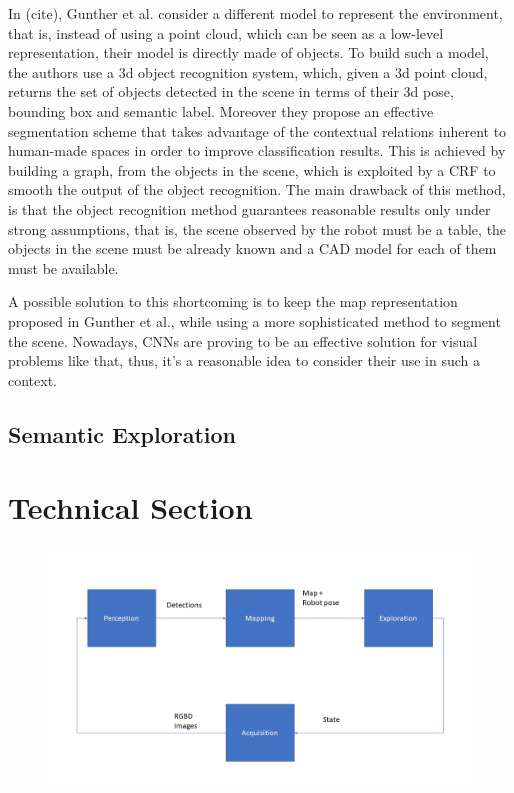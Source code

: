 \documentclass{article}
\begin{document}
	In (cite), Gunther et al. consider a different model to represent the environment, that is, instead of using a point cloud, which can be seen as a low-level representation, their model is directly made of objects. To build such a model, the authors use a 3d object recognition system, which, given a 3d point cloud, returns the set of objects detected in the scene in terms of their 3d pose, bounding box and semantic label. Moreover they propose an effective segmentation scheme that takes advantage of the contextual relations inherent to human-made spaces in order to improve classification results. This is achieved by building a graph, from the objects in the scene, which is exploited by a CRF to smooth the output of the object recognition. The main drawback of this method, is that the object recognition method guarantees reasonable results only under strong assumptions, that is, the scene observed by the robot must be a table, the objects in the scene must be already known and a CAD model for each of them must be available.
	
	A possible solution to this shortcoming is to keep the map representation proposed in Gunther et al., while using a more sophisticated method to segment the scene. Nowadays, CNNs are proving to be an effective solution for visual problems like that, thus, it's a reasonable idea to consider their use in such a context.
		
	\subsection*{Semantic Exploration}
	
	\section*{Technical Section}
		 
	 \begin{figure}[htbp]
	 	\centering
	 	\includegraphics[width=\linewidth]{pics/pipeline}
	 \end{figure}
	
\end{document}

